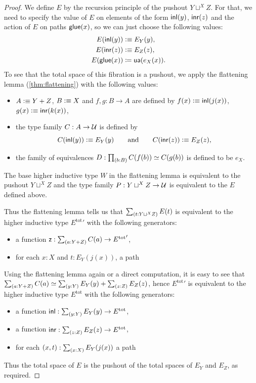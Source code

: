 \begin{proof}
  We define $E$ by the recursion principle of the pushout $Y\sqcup^XZ$. For
  that, we need to specify the value of $E$ on elements of the form ${\mathsf{inl}}(y)$, ${\mathsf{inr}}(z)$
  and the action of $E$ on paths $\mathsf{glue}(x)$, so we can just choose the following
  values:
  \begin{align*}
    E({\mathsf{inl}}(y)) & \vcentcolon\equiv E_Y(y),\\
    E({\mathsf{inr}}(z)) & \vcentcolon\equiv E_Z(z),\\
    {E}\mathopen{}\left({\mathsf{glue}(x)}\right)\mathclose{} & \coloneqq \mathsf{ua}(e_X(x)).
  \end{align*}
  To see that the total space of this fibration is a pushout, we apply the
  flattening lemma (\cref{thm:flattening}) with the following values:
  \begin{itemize}
  \item $A\vcentcolon\equiv Y+Z$, $B\vcentcolon\equiv X$ and $f,g:B\to A$ are defined by
    $f(x)\vcentcolon\equiv{\mathsf{inl}}(j(x))$, $g(x)\vcentcolon\equiv{\mathsf{inr}}(k(x))$,
  \item the type family $C:A\to\mathcal{U}$ is defined by
    \begin{equation*}
      C({\mathsf{inl}}(y)) \vcentcolon\equiv E_Y(y)
      \qquad\text{and}\qquad
      C({\mathsf{inr}}(z)) \vcentcolon\equiv E_Z(z),
    \end{equation*}
  \item the family of equivalences $D:\prd{b:B}C(f(b))\eqvsym C(g(b))$ is defined
    to be $e_X$.
  \end{itemize}
  The base higher inductive type $W$ in the flattening lemma is equivalent to
  the pushout $Y\sqcup^XZ$ and the type family $P:Y\sqcup^XZ\to\mathcal{U}$ is
  equivalent to the $E$ defined above.

  Thus the flattening lemma tells us that $\sm{t:Y\sqcup^XZ}E(t)$ is equivalent
  to the higher inductive type ${E^{\mathrm{tot}}}'$ with the following generators:
  \begin{itemize}
  \item a function $\mathsf{z}:\sm{a:Y+Z}C(a)\to {E^{\mathrm{tot}}}'$,
  \item for each $x:X$ and $t:E_Y(j(x))$, a path
  \end{itemize}
  Using the flattening lemma again or a direct computation, it is easy to see
  that $\eqv{\sm{a:Y+Z}C(a)}{\sm{y:Y}E_Y(y)+\sm{z:Z}E_Z(z)}$, hence
  ${E^{\mathrm{tot}}}'$ is equivalent to the higher inductive type
  $E^{\mathrm{tot}}$ with the following generators:
  \begin{itemize}
  \item a function $\inl:\sm{y:Y}E_Y(y)\to E^{\mathrm{tot}}$,
  \item a function $\inr:\sm{z:Z}E_Z(z)\to E^{\mathrm{tot}}$,
  \item for each $(x,t):\sm{x:X}E_Y(j(x))$ a path
  \end{itemize}
  Thus the total space of $E$ is the pushout of the total spaces of
  $E_Y$ and $E_Z$, as required.
\end{proof}

